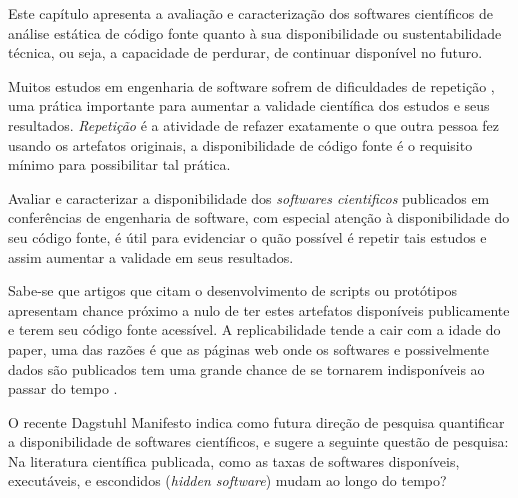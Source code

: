 {Este capítulo apresenta a avaliação e caracterização dos softwares científicos
de análise estática de código fonte quanto à sua disponibilidade ou
sustentabilidade técnica, ou seja, a capacidade de perdurar, de continuar
disponível no futuro.}
\label{caracterizacao-ferramentas}

%
% 

Muitos estudos em engenharia de software sofrem de dificuldades de repetição
\cite{Tang2016}, uma prática importante para aumentar a validade científica dos
estudos e seus resultados. {\it Repetição} é a atividade de refazer exatamente
o que outra pessoa fez usando os artefatos originais, a disponibilidade de
código fonte é o requisito mínimo para possibilitar tal prática.

Avaliar e caracterizar a disponibilidade dos {\it softwares cientificos}
publicados em conferências de engenharia de software, com especial atenção à
disponibilidade do seu código fonte, é útil para evidenciar o quão possível é
repetir tais estudos e assim aumentar a validade em seus resultados.

Sabe-se que artigos que citam o desenvolvimento de scripts ou protótipos
apresentam chance próximo a nulo de ter estes artefatos disponíveis
publicamente e terem seu código fonte acessível. A replicabilidade tende a cair
com a idade do paper, uma das razões é que as páginas web onde os softwares e
possivelmente dados são publicados tem uma grande chance de se tornarem
indisponíveis ao passar do tempo \cite{robles2010replicating}.

O recente Dagstuhl Manifesto \cite{allen2017engineering} indica como futura
direção de pesquisa quantificar a disponibilidade de softwares científicos, e
sugere a seguinte questão de pesquisa: Na literatura científica publicada, como
as taxas de softwares disponíveis, executáveis, e escondidos ({\it hidden
software}) mudam ao longo do tempo?

